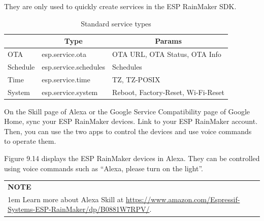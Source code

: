 \documentclass[a4paper,12pt,openany]{book}
\renewcommand{\arraystretch}{1}
\newcommand{\note}[2][NOTE]{ %
\vspace{6pt}
\begin{tabular}{b{\textwidth}}
\hline
\fontfamily{phv}\selectfont \textbf{#1}\\
\leftskip 1em #2\\
\hline
\end{tabular}
}
\begin{document}
\begin{enumerate}[label=\textbf{(\arabic*)}]
    They are only used to quickly create services in the ESP RainMaker SDK.
    \begin{table}[h!]
        \renewcommand{\arraystretch}{1.2}
        \caption{Standard service types}
        \begin{tabular}{|m{7em}|m{12em}|m{19em}|}
            \hline
            \rowcolor{LightBlue} \multicolumn{1}{|c|}{\textbf{Name}}&\multicolumn{1}{c|}{\textbf{Type}}&\multicolumn{1}{c|}{\textbf{Params}}\\
            \hline
            OTA&esp.service.ota&OTA URL, OTA Status, OTA Info\\
            \hline
            Schedule&esp.service.schedules&Schedules\\
            \hline
            Time&esp.service.time&TZ, TZ-POSIX\\
            \hline
            System&esp.service.system&Reboot, Factory-Reset, Wi-Fi-Reset\\
            \hline
        \end{tabular}
    \end{table}
\end{enumerate}

On the Skill page of Alexa or the Google Service Compatibility page of Google Home, sync your ESP RainMaker devices. Link to your ESP RainMaker account. Then, you can use the two apps to control the devices and use voice commands to operate them.

Figure 9.14 displays the ESP RainMaker devices in Alexa. They can be controlled using voice commands such as “Alexa, please turn on the light”.

\note{Learn more about Alexa Skill at \href{https://www.amazon.com/Espressif-Systems-ESP-RainMaker/dp/B0881W7RPV/}{https://www.amazon.com/Espressif-Systems-ESP-Rain\newline Maker/dp/B0881W7RPV/}.}
\end{document}
